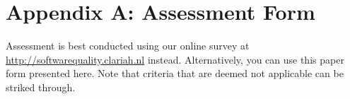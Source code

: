 \documentclass[a4paper,11pt]{article}
\begin{document}








\pagebreak %
\appendix
\newcommand{\appname}{Appendix A: Assessment Form}
\section*{\appname}

Assessment is best conducted using our online survey at
\url{http://softwarequality.clariah.nl} instead.
Alternatively, you can use this paper form presented here. Note that criteria
that are deemed not applicable can be striked through.
\end{document}
